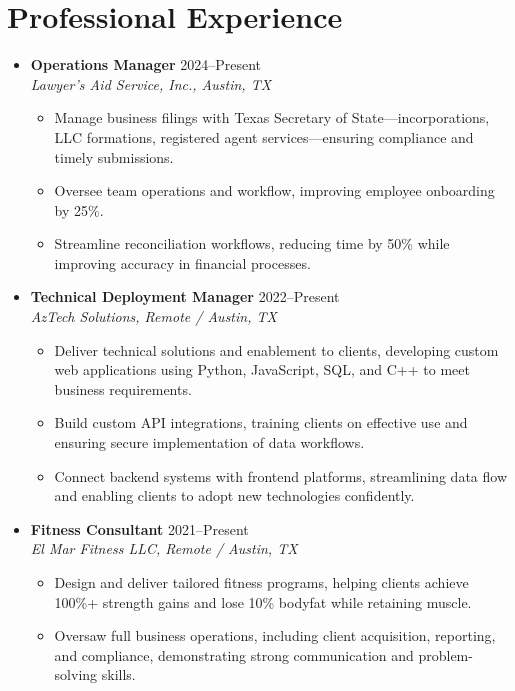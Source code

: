\documentclass[letterpaper,10pt]{article}
\newcommand{\resumeItem}[1]{\item \small{#1}}
\begin{document}
\section*{Professional Experience}
\begin{itemize}
  \item[]
    \textbf{Operations Manager} \hfill 2024--Present \\
    \textit{Lawyer's Aid Service, Inc., Austin, TX}
  \begin{itemize}
    \resumeItem{Manage business filings with Texas Secretary of State---incorporations, LLC formations, registered agent services---ensuring compliance and timely submissions.}
    \resumeItem{Oversee team operations and workflow, improving employee onboarding by 25\%.}
    \resumeItem{Streamline reconciliation workflows, reducing time by 50\% while improving accuracy in financial processes.}
  \end{itemize}

  \item[]
    \textbf{Technical Deployment Manager} \hfill 2022--Present \\
    \textit{AzTech Solutions, Remote / Austin, TX}
  \begin{itemize}
    \resumeItem{Deliver technical solutions and enablement to clients, developing custom web applications using Python, JavaScript, SQL, and C++ to meet business requirements.}
    \resumeItem{Build custom API integrations, training clients on effective use and ensuring secure implementation of data workflows.}
    \resumeItem{Connect backend systems with frontend platforms, streamlining data flow and enabling clients to adopt new technologies confidently.}
  \end{itemize}

  \item[]
    \textbf{Fitness Consultant} \hfill 2021--Present \\
    \textit{El Mar Fitness LLC, Remote / Austin, TX}
  \begin{itemize}
    \resumeItem{Design and deliver tailored fitness programs, helping clients achieve 100\%+ strength gains and lose 10\% bodyfat while retaining muscle.}
    \resumeItem{Oversaw full business operations, including client acquisition, reporting, and compliance, demonstrating strong communication and problem-solving skills.}
  \end{itemize}
\end{itemize}

\end{document}

